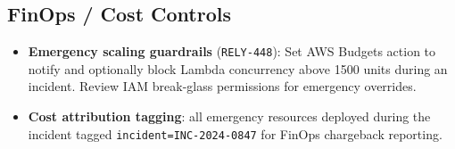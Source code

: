 \subsection{FinOps / Cost Controls}

\begin{itemize}[leftmargin=*, itemsep=3pt]
  \item[\textcolor{statusopen}{\faIcon{circle}}]
    \textbf{Emergency scaling guardrails} (\texttt{RELY-448}): Set AWS Budgets action
    to notify and optionally block Lambda concurrency above 1500 units during
    an incident. Review IAM break-glass permissions for emergency overrides.

  \item[\textcolor{statusdone}{\faIcon{check-circle}}]
    \textbf{Cost attribution tagging}: all emergency resources deployed during the
    incident tagged \texttt{incident=INC-2024-0847} for FinOps chargeback reporting.
\end{itemize}

